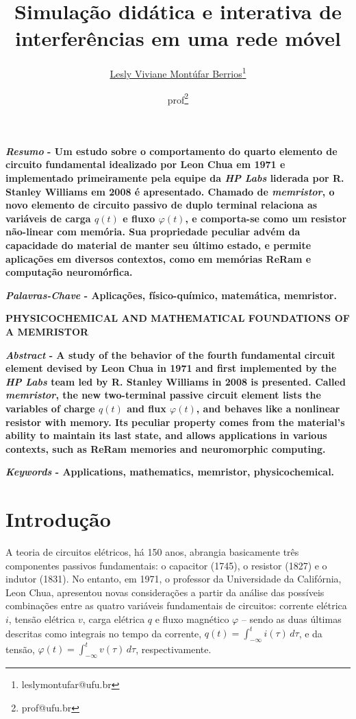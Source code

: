 \documentclass{ceel}
\title{Simulação didática e interativa de interferências em uma rede móvel}
\author[1]{\underline{Lesly Viviane Montúfar Berrios}\thanks{leslymontufar@ufu.br}}
\author[2]{prof\thanks{prof@ufu.br}}
\affil[1]{FEELT - Universidade Federal de Uberlândia}
\affil[2]{FEELT - Professor Adjunto - Universidade Federal de Uberlândia}
\begin{document}
\inserirtitulo

\begin{multicols}{2}

\textbf{\emph{Resumo} - Um estudo sobre o comportamento do quarto elemento de circuito fundamental idealizado por Leon Chua em 1971 e implementado primeiramente pela equipe da \emph{HP Labs} liderada por R. Stanley Williams em 2008 é apresentado. Chamado de \emph{memristor}, o novo elemento de circuito passivo de duplo terminal relaciona as variáveis de carga $q(t)$ e fluxo $\varphi(t)$, e comporta-se como um resistor não-linear com memória. Sua propriedade peculiar advém da capacidade do material de manter seu último estado, e permite aplicações em diversos contextos, como em memórias ReRam e computação neuromórfica.} %
\vspace*{10pt}

\textbf{\emph{Palavras-Chave} - Aplicações, físico-químico, matemática, memristor.}


\begin{center}

\noindent\textbf{\large \uppercase{Physicochemical and Mathematical Foundations of a Memristor}}
\end{center}

\textbf{\emph{Abstract} - A study of the behavior of the fourth fundamental circuit element devised by Leon Chua in 1971 and first implemented by the \emph{HP Labs} team led by R. Stanley Williams in 2008 is presented. Called \emph {memristor}, the new two-terminal passive circuit element lists the variables of charge $q(t)$ and flux $\varphi(t)$, and behaves like a nonlinear resistor with memory. Its peculiar property comes from the material's ability to maintain its last state, and allows applications in various contexts, such as ReRam memories and neuromorphic computing.}
\vspace*{10pt}

\textbf{\emph{Keywords} - Applications, mathematics, memristor, physicochemical.}


\section{Introdução}
A teoria de circuitos elétricos, há 150 anos, abrangia basicamente três componentes passivos fundamentais: o capacitor (1745), o resistor (1827) e o indutor (1831). No entanto, em 1971, o professor da Universidade da Califórnia, Leon Chua, apresentou novas considerações a partir da análise das possíveis combinações entre as quatro variáveis fundamentais de circuitos: corrente elétrica $i$, tensão elétrica $v$, carga elétrica $q$ e fluxo magnético $\varphi$ – sendo as duas últimas descritas como integrais no tempo da corrente, $q(t)=\int_{-\infty}^t i(\tau)\, d\tau$, e da tensão, $\varphi(t)=\int_{-\infty}^t v(\tau)\, d\tau$, respectivamente.


\end{multicols}
\end{document}
